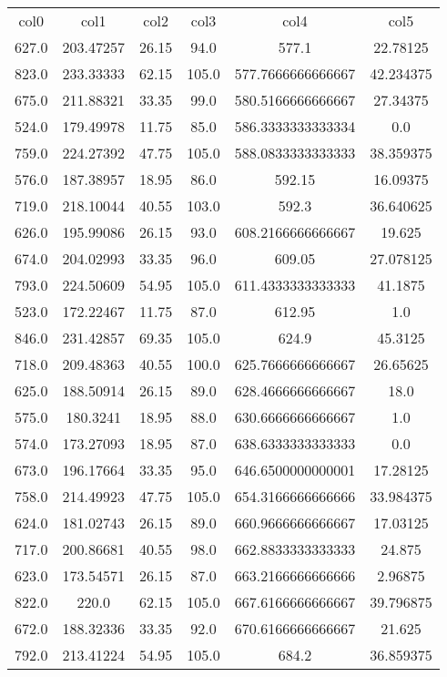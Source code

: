 \begin{table}
\begin{tabular}{cccccc}
col0 & col1 & col2 & col3 & col4 & col5 \\
627.0 & 203.47257 & 26.15 & 94.0 & 577.1 & 22.78125 \\
823.0 & 233.33333 & 62.15 & 105.0 & 577.7666666666667 & 42.234375 \\
675.0 & 211.88321 & 33.35 & 99.0 & 580.5166666666667 & 27.34375 \\
524.0 & 179.49978 & 11.75 & 85.0 & 586.3333333333334 & 0.0 \\
759.0 & 224.27392 & 47.75 & 105.0 & 588.0833333333333 & 38.359375 \\
576.0 & 187.38957 & 18.95 & 86.0 & 592.15 & 16.09375 \\
719.0 & 218.10044 & 40.55 & 103.0 & 592.3 & 36.640625 \\
626.0 & 195.99086 & 26.15 & 93.0 & 608.2166666666667 & 19.625 \\
674.0 & 204.02993 & 33.35 & 96.0 & 609.05 & 27.078125 \\
793.0 & 224.50609 & 54.95 & 105.0 & 611.4333333333333 & 41.1875 \\
523.0 & 172.22467 & 11.75 & 87.0 & 612.95 & 1.0 \\
846.0 & 231.42857 & 69.35 & 105.0 & 624.9 & 45.3125 \\
718.0 & 209.48363 & 40.55 & 100.0 & 625.7666666666667 & 26.65625 \\
625.0 & 188.50914 & 26.15 & 89.0 & 628.4666666666667 & 18.0 \\
575.0 & 180.3241 & 18.95 & 88.0 & 630.6666666666667 & 1.0 \\
574.0 & 173.27093 & 18.95 & 87.0 & 638.6333333333333 & 0.0 \\
673.0 & 196.17664 & 33.35 & 95.0 & 646.6500000000001 & 17.28125 \\
758.0 & 214.49923 & 47.75 & 105.0 & 654.3166666666666 & 33.984375 \\
624.0 & 181.02743 & 26.15 & 89.0 & 660.9666666666667 & 17.03125 \\
717.0 & 200.86681 & 40.55 & 98.0 & 662.8833333333333 & 24.875 \\
623.0 & 173.54571 & 26.15 & 87.0 & 663.2166666666666 & 2.96875 \\
822.0 & 220.0 & 62.15 & 105.0 & 667.6166666666667 & 39.796875 \\
672.0 & 188.32336 & 33.35 & 92.0 & 670.6166666666667 & 21.625 \\
792.0 & 213.41224 & 54.95 & 105.0 & 684.2 & 36.859375 \\

\end{tabular}
\end{table}
